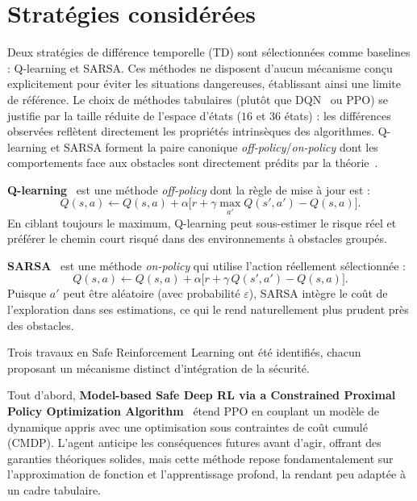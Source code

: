 \documentclass{article}
\begin{document}
\section{Stratégies considérées}

Deux stratégies de différence temporelle (TD) sont sélectionnées comme baselines : Q-learning et SARSA. Ces méthodes ne disposent d'aucun mécanisme conçu explicitement pour éviter les situations dangereuses, établissant ainsi une limite de référence. Le choix de méthodes tabulaires (plutôt que DQN~\citep{mnih2015} ou PPO) se justifie par la taille réduite de l'espace d'états ($16$ et $36$ états) : les différences observées reflètent directement les propriétés intrinsèques des algorithmes. Q-learning et SARSA forment la paire canonique \textit{off-policy}/\textit{on-policy} dont les comportements face aux obstacles sont directement prédits par la théorie~\citep{sutton2018}.

\textbf{Q-learning}~\citep{watkins1992} est une méthode \textit{off-policy} dont la règle de mise à jour est :
\begin{equation}
  Q(s, a) \leftarrow Q(s, a) + \alpha \bigl[r + \gamma \max_{a'} Q(s', a') - Q(s, a)\bigr].
\end{equation}
En ciblant toujours le maximum, Q-learning peut sous-estimer le risque réel et préférer le chemin court risqué dans des environnements à obstacles groupés.

\textbf{SARSA}~\citep{rummery1994} est une méthode \textit{on-policy} qui utilise l'action réellement sélectionnée :
\begin{equation}
  Q(s, a) \leftarrow Q(s, a) + \alpha \bigl[r + \gamma\, Q(s', a') - Q(s, a)\bigr].
\end{equation}
Puisque $a'$ peut être aléatoire (avec probabilité $\varepsilon$), SARSA intègre le coût de l'exploration dans ses estimations, ce qui le rend naturellement plus prudent près des obstacles.

Trois travaux en Safe Reinforcement Learning ont été identifiés, chacun proposant un mécanisme distinct d'intégration de la sécurité.

Tout d'abord, \textbf{Model-based Safe Deep RL via a Constrained Proximal Policy Optimization Algorithm}~\citep{CMDP2022} étend PPO en couplant un modèle de dynamique appris avec une optimisation sous contraintes de coût cumulé (CMDP). L'agent anticipe les conséquences futures avant d'agir, offrant des garanties théoriques solides, mais cette méthode repose fondamentalement sur l'approximation de fonction et l'apprentissage profond, la rendant peu adaptée à un cadre tabulaire.
\end{document}

